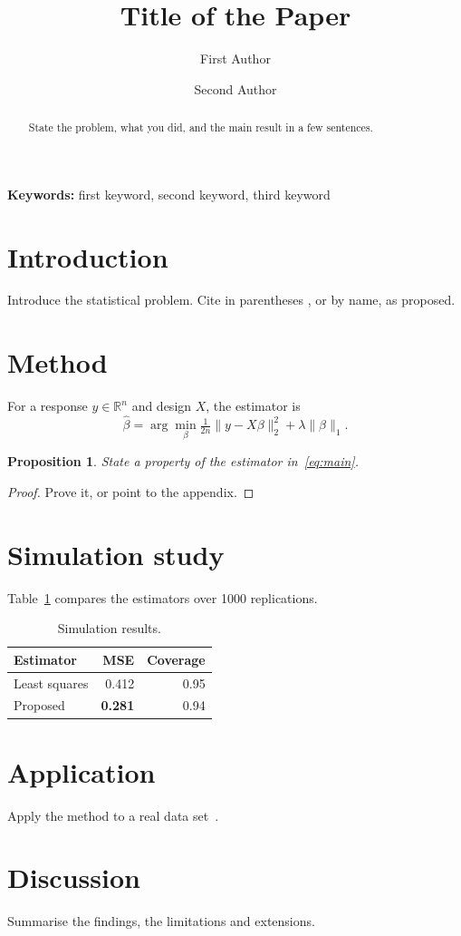 \documentclass[11pt,a4paper]{article}
\title{Title of the Paper}
\author[1]{First Author}
\author[2]{Second Author}
\affil[1]{Department of Statistics, University, City, Country}
\affil[2]{Institute, City, Country}
\date{}
\newtheorem{proposition}{Proposition}
\begin{document}
\maketitle

\begin{abstract}
State the problem, what you did, and the main result in a few sentences.
\end{abstract}

\noindent\textbf{Keywords:} first keyword, second keyword, third keyword

\section{Introduction}
Introduce the statistical problem. Cite in parentheses \citep{efron1979}, or by
name, as \citet{tibshirani1996} proposed.

\section{Method}
For a response $y \in \mathbb{R}^n$ and design $X$, the estimator is
\begin{equation}
  \hat\beta = \arg\min_\beta \tfrac{1}{2n} \lVert y - X\beta \rVert_2^2 + \lambda \lVert \beta \rVert_1 .
  \label{eq:main}
\end{equation}

\begin{proposition}
State a property of the estimator in~\eqref{eq:main}.
\end{proposition}

\begin{proof}
Prove it, or point to the appendix.
\end{proof}

\section{Simulation study}
Table~\ref{tab:sim} compares the estimators over 1000 replications.

\begin{table}[htbp]
  \centering
  \caption{Simulation results.}
  \label{tab:sim}
  \begin{tabular}{lrr}
    \toprule
    Estimator & MSE & Coverage \\
    \midrule
    Least squares & 0.412 & 0.95 \\
    Proposed & \textbf{0.281} & 0.94 \\
    \bottomrule
  \end{tabular}
\end{table}

\section{Application}
Apply the method to a real data set~\citep{dempster1977}.

\section{Discussion}
Summarise the findings, the limitations and extensions.



\end{document}
